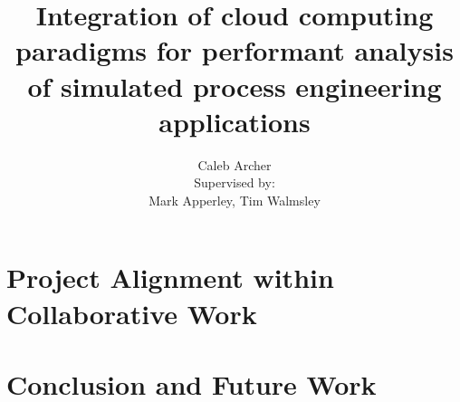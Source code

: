 \documentclass[12pt,a4paper]{uwthesis17}
\title{Integration of cloud computing paradigms for performant analysis of simulated process engineering applications}
\author{
  Caleb Archer \\
  Supervised by: \\
  Mark Apperley, Tim Walmsley
}
\begin{document}

\maketitle

\setcounter{page}{2}

\begin{abstract}

\end{abstract}

\begin{acknowledgements}

\end{acknowledgements}

\begin{authorship-declaration}

\end{authorship-declaration}

\tableofcontents

\listoffigures

\listoftables

\newpage

\setcounter{page}{1}



\chapter{Project Alignment within Collaborative Work}





\chapter{Conclusion and Future Work}

\printbibliography
\end{document}
